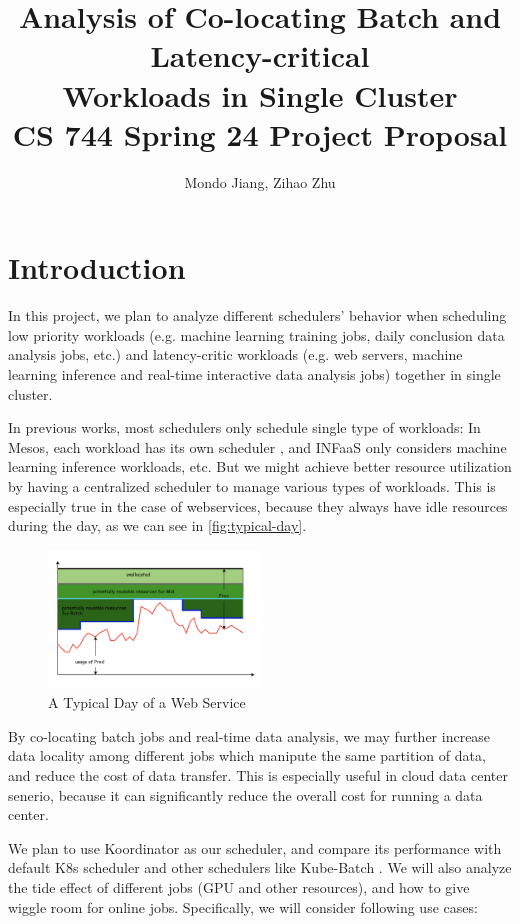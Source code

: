 \documentclass[pdftex,twocolumn,10pt,letterpaper]{article}
\title{
    {
     Analysis of Co-locating Batch and Latency-critical\\
     Workloads in Single Cluster\\
     \large  CS 744 Spring 24 Project Proposal
    }
}
\author{Mondo Jiang, Zihao Zhu}
\date{}
\begin{document}
\maketitle

\section*{Introduction}
In this project, we plan to analyze different schedulers' behavior when scheduling low priority workloads (e.g. machine learning training jobs, daily conclusion data analysis jobs, etc.)  and latency-critic workloads (e.g. web servers, machine learning inference and real-time interactive data analysis jobs) together in single cluster.

In previous works, most schedulers only schedule single type of workloads:
In Mesos, each workload has its own scheduler \cite{hindman2011mesos}, and INFaaS \cite{romero2021infaas} only considers machine learning inference workloads, etc. But we might achieve better resource utilization by having a centralized scheduler to manage various types of workloads. This is especially true in the case of webservices, because they always have idle resources during the day, as we can see in \autoref{fig:typical-day}.

\begin{figure}[h]
	\centering
	\includegraphics[width=0.5\textwidth]{fig/koo-time.png}
	\caption{A Typical Day of a Web Service \cite{koo}}
	\label{fig:typical-day}
\end{figure}

By co-locating batch jobs and real-time data analysis, we may further increase data locality among different jobs which manipute the same partition of data, and reduce the cost of data transfer. This is especially useful in cloud data center senerio, because it can significantly reduce the overall cost for running a data center.

We plan to use Koordinator \cite{koo} as our scheduler, and compare its performance with default K8s scheduler and other schedulers like Kube-Batch \cite{kube-batch}. We will also analyze the tide effect of different jobs (GPU and other resources), and how to give wiggle room for online jobs. Specifically, we will consider following use cases:
\end{document}
